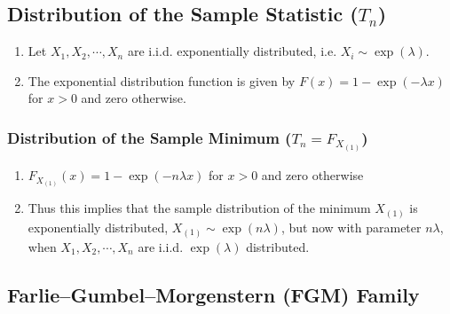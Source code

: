 \subsection{Distribution of the Sample Statistic ($T_n$)}

\begin{enumerate}
    \item Let $X_1 , X_2, \cdots , X _n$ are i.i.d. exponentially distributed, i.e. $X _i \sim \exp(\lambda )$.
    \hfill \cite{statistics/book/Statistics-for-Data-Scientists/Maurits-Kaptein}

    \item The exponential distribution function is given by $F (x) = 1 - \exp (-\lambda x)$ for $x > 0$ and zero otherwise.
    \hfill \cite{statistics/book/Statistics-for-Data-Scientists/Maurits-Kaptein}
\end{enumerate}

\subsubsection{Distribution of the Sample Minimum ($T_n = F _{X_{(1)}}$)}

\begin{enumerate}
    \item $F _{X_{(1)}} (x) = 1 - \exp (-n\lambda x)$ for $x > 0$ and zero otherwise
    \hfill \cite{statistics/book/Statistics-for-Data-Scientists/Maurits-Kaptein}

    \item Thus this implies that the sample distribution of the minimum $X_{(1)}$ is exponentially distributed, $X_{(1)} \sim \exp (n\lambda)$, but now with parameter $n\lambda$, when $X_1 ,X_2, \cdots , X _n$ are i.i.d. $\exp(\lambda)$ distributed.
    \hfill \cite{statistics/book/Statistics-for-Data-Scientists/Maurits-Kaptein}
\end{enumerate}



\subsection{Farlie–Gumbel–Morgenstern (FGM) Family}

